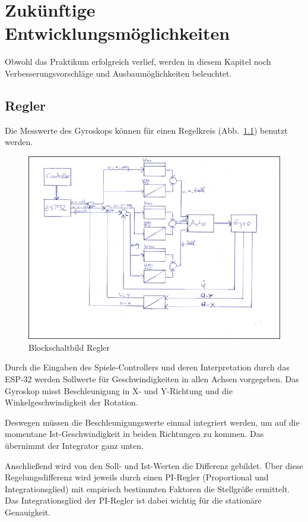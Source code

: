 \chapter{Zukünftige Entwicklungsmöglichkeiten}
Obwohl das Praktikum erfolgreich verlief, werden in diesem Kapitel noch Verbesserungsvorschläge und Ausbaumöglichkeiten beleuchtet. 

\section{Regler}
Die Messwerte des Gyroskops können für einen Regelkreis (Abb.~\ref{bild:regler}) benutzt werden. 

\begin{figure}[!ht]
	\centering
	\includegraphics[width=\textwidth]{bilder/regler.png}
	\caption{Blockschaltbild Regler}
	\label{bild:regler}
\end{figure}

Durch die Eingaben des Spiele-Controllers und deren Interpretation durch das ESP-32 werden Sollwerte für Geschwindigkeiten in allen Achsen vorgegeben. 
Das Gyroskop misst Beschleunigung in X- und Y-Richtung und die Winkelgeschwindigkeit der Rotation. 

Deswegen müssen die Beschleunigungswerte einmal integriert werden, um auf die momentane Ist-Geschwindigkeit in beiden Richtungen zu kommen. 
Das übernimmt der Integrator ganz unten. 

Anschließend wird von den Soll- und Ist-Werten die Differenz gebildet. 
Über diese Regelungsdifferenz wird jeweils durch einen PI-Regler (Proportional und Integrationsglied) mit empirisch bestimmten Faktoren die Stellgröße ermittelt. 
Das Integrationsglied der PI-Regler ist dabei wichtig für die stationäre Genauigkeit. 

